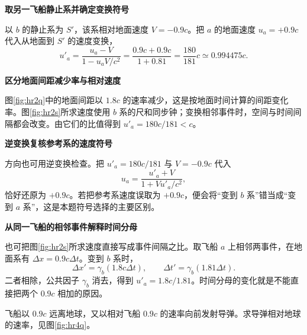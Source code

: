 \begin{solution}\textbf{取另一飞船静止系并确定变换符号}\par\nobreak
以 $b$ 的静止系为 $S'$，该系相对地面速度 $V=-0.9c$。把 $a$ 的地面速度 $u_a=+0.9c$ 代入从地面到 $S'$ 的速度变换，
\[
u'_a=\frac{u_a-V}{1-u_aV/c^2}
=\frac{0.9c+0.9c}{1+0.81}
=\boxed{\frac{180}{181}c\simeq0.994475c}.
\]



\par\medskip{}\noindent\textbf{区分地面间距减少率与相对速度}\par\nobreak
图\ref{fig:hr2q}中的地面间距以 $1.8c$ 的速率减少，这是按地面时间计算的间距变化率。图\ref{fig:hr2s}所求速度使用 $b$ 系的尺和同步钟；变换相邻事件时，空间与时间间隔都会改变。由它们的比值得到 $u'_a=180c/181<c$。


\par\medskip{}\noindent\textbf{逆变换复核参考系的速度符号}\par\nobreak
方向也可用逆变换检查。把 $u'_a=180c/181$ 与 $V=-0.9c$ 代入
\[
u_a=\frac{u'_a+V}{1+Vu'_a/c^2},
\]
恰好还原为 $+0.9c$。若把参考系速度误取为 $+0.9c$，便会将“变到 $b$ 系”错当成“变到 $a$ 系”，这是本题符号选择的主要区别。



\par\medskip{}\noindent\textbf{从同一飞船的相邻事件解释时间分母}\par\nobreak
也可把图\ref{fig:hr2s}所求速度直接写成事件间隔之比。取飞船 \(a\) 上相邻两事件，在地面系有 \(\Delta x=0.9c\Delta t\)。变到 \(b\) 系时，
\[
 \Delta x'=\gamma_b(1.8c\Delta t),\qquad
 \Delta t'=\gamma_b(1.81\Delta t).
\]
二者相除，公共因子 \(\gamma_b\) 消去，得到 \(u'_a=1.8c/1.81\)。时间分母的变化就是不能直接把两个 \(0.9c\) 相加的原因。
\end{solution}

\begin{question}
\begin{example}[飞船向前发射导弹]\label{ex:hr4}
飞船以 $0.9c$ 远离地球，又以相对飞船 $0.9c$ 的速率向前发射导弹。求导弹相对地球的速率，见图\ref{fig:hr4q}。
\end{example}
\end{question}

